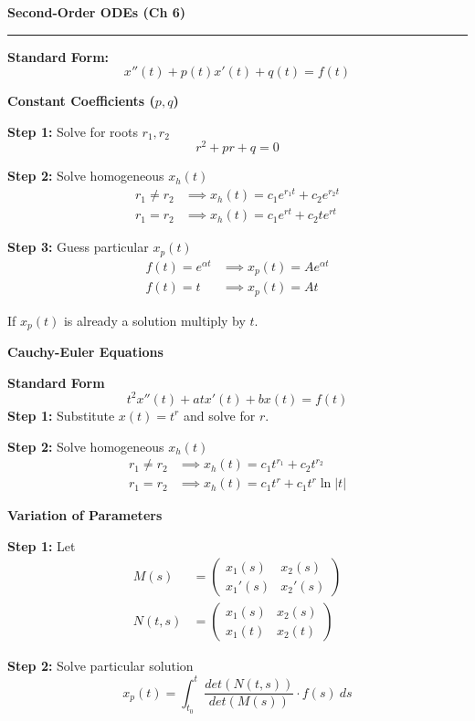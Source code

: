 \documentclass[12pt]{article}
\newcommand{\heading}[1]{%
  \vspace{10pt}
  \textbf{#1} \\[-12pt]
  \rule{\linewidth}{0.4pt}
  \par\vspace{2pt}
}
\newcommand{\sub}[1]{\smallskip\textbf{#1}\;}
\newlength{\colw}
\begin{document}
\noindent
\begin{minipage}[t]{\colw}

    \heading{Second-Order ODEs (Ch 6)}

    \textbf{Standard Form:}
    \[ x''(t) + p(t)x'(t) + q(t) = f(t) \]

    \sub{Constant Coefficients ($p,q$)}

    \textbf{Step 1:} Solve for roots $r_1, r_2$
    \[
        r^2 + pr + q = 0
    \]

    \textbf{Step 2:} Solve homogeneous $x_h(t)$
    \begin{align*}
        r_1 \neq r_2 & \implies x_h(t) = c_1e^{r_1t} + c_2e^{r_2t} \\
        r_1 = r_2    & \implies x_h(t) = c_1e^{rt} + c_2te^{rt}
    \end{align*}

    \textbf{Step 3:} Guess particular $x_p(t)$
    \begin{align*}
        f(t) = e^{\alpha t} & \implies x_p(t) = Ae^{\alpha t} \\
        f(t) = t            & \implies x_p(t) = At
    \end{align*}

    If $x_p(t)$ is already a solution multiply by $t$.

    \sub{Cauchy-Euler Equations}

    \textbf{Standard Form}
    \[
        t^2x''(t) + atx'(t) + bx(t) = f(t)
    \]
    \textbf{Step 1:} Substitute $x(t) = t^r$ and solve for $r$.

    \textbf{Step 2:} Solve homogeneous $x_h(t)$
    \begin{align*}
        r_1 \neq r_2 & \implies x_h(t) = c_1t^{r_1} + c_2t^{r_2}    \\
        r_1 = r_2    & \implies x_h(t) = c_1t^{r} + c_1t^{r} \ln|t|
    \end{align*}

    \sub{Variation of Parameters}

    \textbf{Step 1:} Let
    \begin{align*}
        M(s)    & = \begin{pmatrix}
                        x_1(s) & x_2(s) \\ x_1'(s) & x_2'(s)
                    \end{pmatrix} \\
        N(t, s) & = \begin{pmatrix}
                        x_1(s) & x_2(s) \\ x_1(t) & x_2(t)
                    \end{pmatrix}
    \end{align*}

    \textbf{Step 2:} Solve particular solution
    \[ x_p(t) = \int_{t_0}^{t} \frac{det(N(t,s))}{det(M(s))} \cdot f(s) ~ ds \]

\end{minipage}
\end{document}
